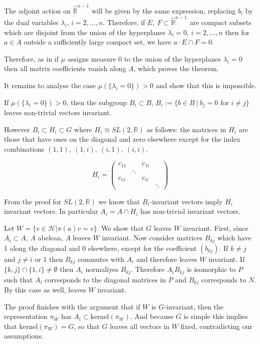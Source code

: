 \documentclass[
  12pt
]{article}
\theoremstyle{plain}
\newcommand{\G}{\ensuremath{G}\xspace}
\newcommand{\bbr}{\ensuremath{\mathbb{R}}\xspace}
\newcommand{\hilb}{\ensuremath{\mathscr{H}}\xspace}
\newcommand{\sltr}{\ensuremath{SL(2, \mathbb{R})}\xspace}
\begin{document}
  The adjoint action on $\hat{\bbr}^{n-1}$ will be given by the same expression,
  replacing $b_i$ by the dual variables $\lambda_i$, $i = 2, \dots , n$.
  Therefore, if $E,\ F \subset \hat{\bbr}^{n-1}$ are
  compact subsets which are disjoint from the union of the hyperplanes $\lambda_i = 0$,
  $i = 2, \dots , n$ then for $a\in A$ outside a sufficiently large compact set, we have
  $a\cdot E \cap F = 0$.

  Therefore, as in  if $\mu$ assigns measure $0$ to the union of the hyperplanes $\lambda_i =0$ then all matrix coefficients vanish along $A$, which proves the theorem.

  It remains to analyse the case $\mu(\{\lambda_i=0\}) > 0$ and show that this is impossible.

  If $\mu(\{\lambda_i=0\}) > 0$, then the subgroup $B_i \subset B$, $B_i := \{b \in B\ |\ b_j=0 \text{ for } i\neq j\}$ leaves non-trivial vectors invariant.

  However $B_i \subset H_i \subset G$ where $H_i \cong \sltr$ as follows: the matrices in $H_i$ are those that have ones on the diagonal and zero elsewhere except for the index combinations $(1,1),\ (1,i),\ (i,1),\ (i,i)$.

  $$
  H_i = \begin{pmatrix}
    c_{11} & & c_{1i} & \\
           & \ddots & & \\
    c_{i1} & & c_{ii}&  \\
           & & & \ddots
  \end{pmatrix}
  $$

  From the proof for \sltr we know that $B_i$-invariant vectors imply $H_i$ invariant vectors. In particular $A_i = A \cap H_i$ has non-trivial invariant vectors.

  Let $W = \{v \in \hilb | \pi(a)v=v\}$. We show that \G leaves $W$ invariant.
  First, since $A_i \subset A$, $A$ abelean, $A$ leaves $W$ invariant. Now
  consider matrices $B_{kj}$ which have 1 along the diagonal and 0 elsewhere,
  except for the coefficient $(b_{kj})$. If $k\neq j$ and $j\neq i$ or $1$ then
  $B_{kj}$ commutes with $A_i$ and therefore leaves $W$ invariant. If
  $\{k,j\}\cap \{1,i\} \neq \emptyset$ then $A_i$ normaliyes $B_{kj}$.
  Therefore $A_iB_{kj}$ is isomorphic to $P$ such that $A_i$ corresponds to the
  diagonal matrices in $P$ and $B_{kj}$ corresponds to $N$. By
   this case as well, leaves $W$ invariant.

  The proof finishes with the argument that if $W$ is \G-invariant, then the
  representation $\pi_W$ has $A_i \subset \text{kernel}(\pi_W)$. And because \G
  is simple this implies that $\text{kernel}(\pi_W) = G$, so that \G leaves all
  vectors in $W$ fixed, contradicting our assumptions.
\end{document}

